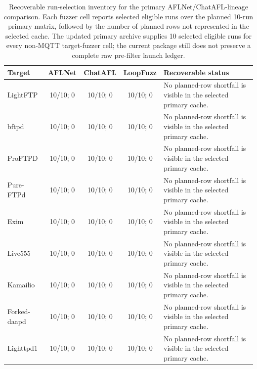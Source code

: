 \documentclass[final,5p,times,number]{elsarticle}
\begin{document}
\begin{table}[!t]
\centering
\caption{Recoverable run-selection inventory for the primary AFLNet/ChatAFL-lineage comparison. Each fuzzer cell reports selected eligible runs over the planned 10-run primary matrix, followed by the number of planned rows not represented in the selected cache. The updated primary archive supplies 10 selected eligible runs for every non-MQTT target-fuzzer cell; the current package still does not preserve a complete raw pre-filter launch ledger.}
\label{tab:run_filtering_inventory}
{\scriptsize
\setlength{\tabcolsep}{3.5pt}
\renewcommand{\arraystretch}{1.05}
\begin{tabularx}{\textwidth}{l c c c X}
\toprule
Target & AFLNet & ChatAFL & LoopFuzz & Recoverable status \\
\midrule
LightFTP & 10/10; 0 & 10/10; 0 & 10/10; 0 & No planned-row shortfall is visible in the selected primary cache. \\
bftpd & 10/10; 0 & 10/10; 0 & 10/10; 0 & No planned-row shortfall is visible in the selected primary cache. \\
ProFTPD & 10/10; 0 & 10/10; 0 & 10/10; 0 & No planned-row shortfall is visible in the selected primary cache. \\
Pure-FTPd & 10/10; 0 & 10/10; 0 & 10/10; 0 & No planned-row shortfall is visible in the selected primary cache. \\
Exim & 10/10; 0 & 10/10; 0 & 10/10; 0 & No planned-row shortfall is visible in the selected primary cache. \\
Live555 & 10/10; 0 & 10/10; 0 & 10/10; 0 & No planned-row shortfall is visible in the selected primary cache. \\
Kamailio & 10/10; 0 & 10/10; 0 & 10/10; 0 & No planned-row shortfall is visible in the selected primary cache. \\
Forked-daapd & 10/10; 0 & 10/10; 0 & 10/10; 0 & No planned-row shortfall is visible in the selected primary cache. \\
Lighttpd1 & 10/10; 0 & 10/10; 0 & 10/10; 0 & No planned-row shortfall is visible in the selected primary cache. \\
\bottomrule
\end{tabularx}
}
\end{table}
\end{document}
